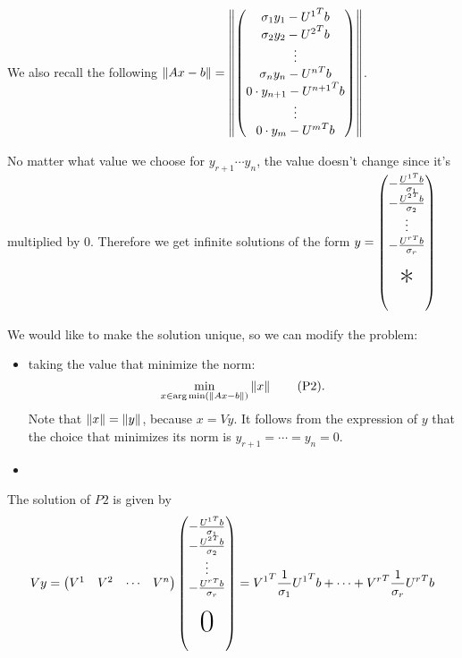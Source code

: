 \documentclass[computational_mathematics.tex]{subfiles}
\begin{document}
We also recall the following 
$\left\lVert Ax-b\right\rVert = \left\lVert
      \begin{pmatrix}
        \sigma_1 y_1 - {U^1}^{T}b\\
        \sigma_2 y_2 -{U^2}^{T}b\\
        \vdots\\
        \sigma_n y_n -{U^n}^{T}b\\
        0 \cdot y_{n+1} - {U^{n+1}}^{T}b\\
        \vdots\\
        0 \cdot y_m -{U^m}^{T}b\\
      \end{pmatrix}
    \right\rVert$.
    
No matter what value we choose for $y_{r+1} \cdots y_{n}$, the value doesn't change since it's multiplied by $0$.
 Therefore we get infinite solutions of the form $ y =
 \begin{pmatrix}
   -\frac{\tr{U^1} b}{\sigma_1}\\
    -\frac{\tr{U^2} b}{\sigma_2}\\
    \vdots\\
    -\frac{\tr{U^r} b}{\sigma_r}\\
    \\
    \text{\Huge{*}}\\
    \\
  \end{pmatrix}$

We would like to make the solution unique, so we can modify the problem:
  \begin{itemize}
    \item taking the value that minimize the norm:
    \begin{equation}
    	\min\limits_{x \in \arg\min(\left\lVert Ax-b\right\rVert)} \left\lVert x\right\rVert \tag{P2}.
    \end{equation}
Note that $\left\lVert x\right\rVert = \left\lVert y\right\rVert$, because $x = Vy$. It follows from the expression of $y$ that  the choice that minimizes its norm is $y_{r+1} = \cdots = y_{n} =0$.
    \item 
  \end{itemize}

  The solution of $P2$ is given by
  \[
    Vy = \begin{pmatrix} V^1 & V^2 & \cdots & V^{n} \end{pmatrix} \begin{pmatrix}
   -\frac{\tr{U^1} b}{\sigma_1}\\
    -\frac{\tr{U^2} b}{\sigma_2}\\
    \vdots\\
    -\frac{\tr{U^r} b}{\sigma_r}\\
    \\
    \text{\Huge{0}}\\
    \\
  \end{pmatrix}
  = \tr{V^1} \frac{1}{\sigma_1} \tr{U^1} b + \cdots + \tr{V^r} \frac{1}{\sigma_r} \tr{U^r} b
\]
\end{document}
